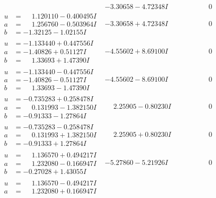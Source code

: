 \documentclass[1p]{elsarticle_modified}
\theoremstyle{definition}
\begin{document}
$$\begin{array}{c|c|c}
 & -3.30658 - 4.72348 I & \phantom{-0.000000 } 0 \\ \hline\begin{aligned}
u &= \phantom{-}1.120110 - 0.400495 I \\
a &= \phantom{-}1.256760 - 0.503964 I \\
b &= -1.32125 - 1.02155 I\end{aligned}
 & -3.30658 + 4.72348 I & \phantom{-0.000000 } 0 \\ \hline\begin{aligned}
u &= -1.133440 + 0.447556 I \\
a &= -1.40826 + 0.51127 I \\
b &= \phantom{-}1.33693 + 1.47390 I\end{aligned}
 & -4.55602 + 8.69100 I & \phantom{-0.000000 } 0 \\ \hline\begin{aligned}
u &= -1.133440 - 0.447556 I \\
a &= -1.40826 - 0.51127 I \\
b &= \phantom{-}1.33693 - 1.47390 I\end{aligned}
 & -4.55602 - 8.69100 I & \phantom{-0.000000 } 0 \\ \hline\begin{aligned}
u &= -0.735283 + 0.258478 I \\
a &= \phantom{-}0.131993 - 1.382150 I \\
b &= -0.91333 - 1.27864 I\end{aligned}
 & \phantom{-}2.25905 - 0.80230 I & \phantom{-0.000000 } 0 \\ \hline\begin{aligned}
u &= -0.735283 - 0.258478 I \\
a &= \phantom{-}0.131993 + 1.382150 I \\
b &= -0.91333 + 1.27864 I\end{aligned}
 & \phantom{-}2.25905 + 0.80230 I & \phantom{-0.000000 } 0 \\ \hline\begin{aligned}
u &= \phantom{-}1.136570 + 0.494217 I \\
a &= \phantom{-}1.232080 - 0.166947 I \\
b &= -0.27028 + 1.43055 I\end{aligned}
 & -5.27860 - 5.21926 I & \phantom{-0.000000 } 0 \\ \hline\begin{aligned}
u &= \phantom{-}1.136570 - 0.494217 I \\
a &= \phantom{-}1.232080 + 0.166947 I \\

\end{aligned}
\end{array}$$
\end{document}
